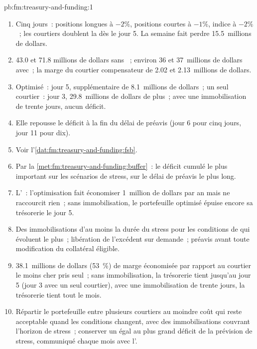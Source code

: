 \begin{solution}{pb:fm:treasury-and-funding:1}
\begin{enumerate}
\item Cinq jours~: positions longues à $-2\%$, positions courtes à $-1\%$, indice à $-2\%$~; les courtiers doublent la  dès le jour 5. La semaine fait perdre 15.5~millions de dollars.
\item 43.0 et 71.8 millions de dollars sans ~; environ 36 et 37~millions de dollars avec~; la marge du courtier compensateur de 2.02 et 2.13~millions de dollars.
\item Optimisé~: jour 5,  supplémentaire de 8.1~millions de dollars~; un seul courtier~: jour 3, 29.8~millions de dollars de plus~; avec une immobilisation de trente jours, aucun déficit.
\item Elle repousse le déficit à la fin du délai de préavis (jour 6 pour cinq jours, jour 11 pour dix).
\item Voir l'\cref{dat:fm:treasury-and-funding:fsb}.
\item Par la \cref{met:fm:treasury-and-funding:buffer}~: le déficit cumulé le plus important sur les scénarios de stress, sur le délai de préavis le plus long.
\item L'~: l'optimisation fait économiser 1~million de dollars par an mais ne raccourcit rien~; sans immobilisation, le portefeuille optimisé épuise encore sa trésorerie le jour 5.
\item Des immobilisations d'au moins la durée du stress pour les conditions de  qui évoluent le plus~; libération de l'excédent sur demande~; préavis avant toute modification
du collatéral éligible.
\item 38.1~millions de dollars (53~\%) de marge économisée par rapport au courtier le moins cher pris seul~; sans immobilisation, la trésorerie tient jusqu'au jour 5 (jour 3 avec un seul courtier),
avec une immobilisation de trente jours, la trésorerie tient tout le mois.
\item Répartir le portefeuille entre plusieurs courtiers au moindre coût qui reste acceptable quand les conditions changent, avec des immobilisations couvrant l'horizon de stress~;
conserver un  égal au plus grand déficit de la prévision de stress, communiqué chaque mois avec l'.
\end{enumerate}
\end{solution}

